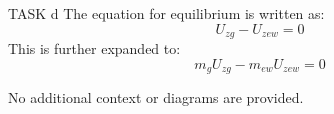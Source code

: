 TASK d  
The equation for equilibrium is written as:  
\[
U_{zg} - U_{zew} = 0
\]  
This is further expanded to:  
\[
m_g U_{zg} - m_{ew} U_{zew} = 0
\]  

No additional context or diagrams are provided.